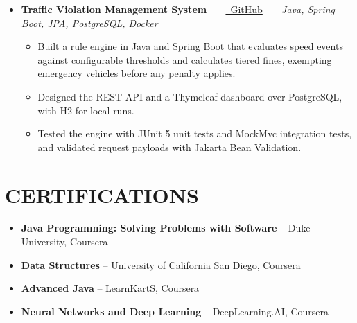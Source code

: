 \documentclass[11pt,a4paper]{article}
\newcommand{\resumeProjectHeading}[3]{%
    \item[]
    \noindent
    \textbf{#1} \ $|$ \ \href{#2}{\small\faGithub\ GitHub} \ $|$ \ \textit{\small #3}
    \par\vspace{0.8pt}
}
\newcommand{\resumeItem}[1]{%
    \item\small #1
}
\begin{document}
\begin{itemize}[leftmargin=0pt]
\begin{itemize}
\end{itemize}


\resumeProjectHeading
{Traffic Violation Management System}
{https://github.com/Krish3101/traffic-rule-engine}
{Java, Spring Boot, JPA, PostgreSQL, Docker}

\begin{itemize}

\resumeItem{
Built a rule engine in Java and Spring Boot that evaluates speed events against configurable thresholds and calculates tiered fines, exempting emergency vehicles before any penalty applies.
}

\resumeItem{
Designed the REST API and a Thymeleaf dashboard over PostgreSQL, with H2 for local runs.
}

\resumeItem{
Tested the engine with JUnit 5 unit tests and MockMvc integration tests, and validated request payloads with Jakarta Bean Validation.
}

\end{itemize}

\end{itemize}


\section{CERTIFICATIONS}

\begin{itemize}[leftmargin=0pt]

\item[]\small{\textbf{Java Programming: Solving Problems with Software} -- Duke University, Coursera}
\vspace{1.5pt}
\item[]\small{\textbf{Data Structures} -- University of California San Diego, Coursera}
\vspace{1.5pt}
\item[]\small{\textbf{Advanced Java} -- LearnKartS, Coursera}
\vspace{1.5pt}
\item[]\small{\textbf{Neural Networks and Deep Learning} -- DeepLearning.AI, Coursera}

\end{itemize}
\end{document}
